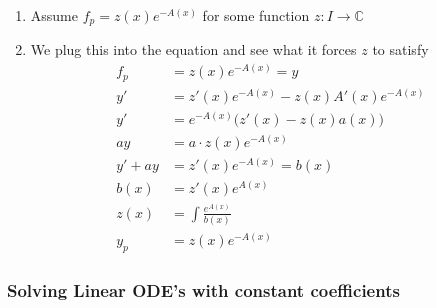\documentclass[8pt]{extarticle}
\newcommand{\C}{{\mathbb C}}
\newcommand{\ra}{{\rightarrow}}
\def\C{\mathbb{C}}
\begin{document}
\begin{multicols*}{3}
  \begin{enumerate}[label=(\arabic*)]
    \item Assume $f_p = z(x) e^{-A(x)}$ for some function
          $z: I \ra \C$
    \item We plug this into the equation and see what
          it forces $z$ to satisfy
          \begin{align*}
            f_p     & = z(x) e^{-A(x)} = y                      \\
            y'      & = z'(x) e^{-A(x)} - z(x) A'(x) e^{-A(x)}  \\
            y'      & = e^{-A(x)} \Big (z'(x) - z(x) a(x)\Big ) \\
            ay      & = a \cdot z(x) e^{-A(x)}                  \\
            y' + ay & = z'(x) e^{-A(x)} = b(x)                  \\
            b(x)    & = z'(x) e^{A(x)}                          \\
            z(x)    & = \int \frac{e^{A(x)}}{b(x)}              \\
            y_p     & = z(x) e^{-A(x)}
          \end{align*}
  \end{enumerate}

    \subsubsection {Solving Linear ODE's with constant coefficients}
  

\end{multicols*}
\end{document}

